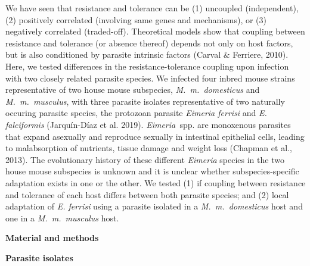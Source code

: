 \documentclass[12pt]{article}
\renewcommand{\_}{\kern-1.5pt\textunderscore\kern-1.5pt}
\begin{document}
\setlength{\parskip}{0.0pt}
We have seen that resistance and tolerance can be (1) uncoupled (independent), (2) positively correlated (involving same genes and mechanisms), or (3) negatively correlated (traded-off). Theoretical models show that coupling between resistance and tolerance (or absence thereof) depends not only on host factors, but is also conditioned by parasite intrinsic factors (Carval $\&$  Ferriere, 2010). Here, we tested differences in the resistance-tolerance coupling upon infection with two closely related parasite species. We infected four inbred mouse strains representative of two house mouse subspecies, \textit{M. m. domesticus} and \textit{M. m. musculus}, with three parasite isolates representative of two naturally occuring parasite species, the protozoan parasite \textit{Eimeria ferrisi} and \textit{E. falciformis }(Jarquín-Díaz et al. 2019). \textit{Eimeria }spp. are monoxenous parasites that expand asexually and reproduce sexually in intestinal epithelial cells, leading to malabsorption of nutrients, tissue damage and weight loss (Chapman et al., 2013). The evolutionary history of these different \textit{Eimeria} species in the two house mouse subspecies is unknown and it is unclear whether subspecies-specific adaptation exists in one or the other. We tested (1) if coupling between resistance and tolerance of each host differs between both parasite species; and (2) local adaptation of \textit{E. ferrisi} using a parasite isolated in a \textit{M. m. domesticus} host and one in a \textit{M. m. musculus} host.\par

\begin{FlushLeft}
{\fontsize{14pt}{16.8pt}\selectfont \textbf{Material and methods}\par}
\end{FlushLeft}\par

{\fontsize{14pt}{16.8pt}\selectfont \textbf{Parasite isolates}\par}\par
\end{document}

